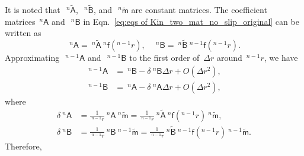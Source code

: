 \documentclass[preprint,10pt,times]{elsarticle}
\numberwithin{equation}{section}
\renewcommand{\u}[1]{\boldsymbol{#1}}
\newcommand{\usf}[1]{\u{\mathsf #1}}
\renewcommand{\>}{$\Rightarrow$}
\begin{document}
It is noted that~$~^{n}\tilde{\usf{A}}$,~$~^{n}\tilde{\usf{B}}$, and~$~^{n}\tilde{\usf{m}}$ are constant matrices. The coefficient matrices~${}^{n}{\usf{A}}$ and~$~^{n}{\usf{B}}$ in Eqn.~\eqref{eq:eqs of Kin_two_mat_no_slip_original} can be written as
\begin{equation}
	~^{n}{\usf{A}} = ~^{n}\tilde{\usf{A}}  ~^{n}\usf{f}({}^{n-1}\!r), \quad
	~^{n}{\usf{B}} = ~^{n}\tilde{\usf{B}}  ~^{n-1}\usf{f}({}^{n-1}\!r).
\end{equation}
Approximating~$~^{{n-1}}{\usf{A}}$ and~$~^{{n-1}}{\usf{B}}$ to the first order of~$\Delta r$ around~${}^{n-1}\!{r}$, we have
\begin{subequations}
\begin{align}
	~^{{n-1}}{\usf{A}} & = ~^{n}\usf{B} - \delta ~^{n}\usf{B} \Delta r + O(\Delta r^2), \\
	~^{{n-1}}{\usf{B}} & = ~^{n}\usf{A} - \delta ~^{n}\usf{A} \Delta r + O(\Delta r^2),
\end{align}
\end{subequations}
where
\begin{subequations}
	\begin{align}
	\delta ~^{n}\usf{A} & = \frac{1}{~^{n-1}\!{r}} ~^{n}\usf{A} ~^{n}\tilde{\usf{m}} = \frac{1}{~^{n-1}\!{r}} ~^{n}\tilde{\usf{A}} ~^{n}\usf{f}({}^{n-1}\!r) ~^{n}\tilde{\usf{m}}, \\
	\delta ~^{n}\usf{B} & = \frac{1}{~^{n-1}\!{r}} ~^{n}\usf{B} ~^{n-1}\tilde{\usf{m}} = \frac{1}{~^{n-1}\!{r}} ~^{n}\tilde{\usf{B}} ~^{n-1}\usf{f}({}^{n-1}\!r) ~^{n-1}\tilde{\usf{m}}.
	\end{align}
\end{subequations}
Therefore,
\end{document}
